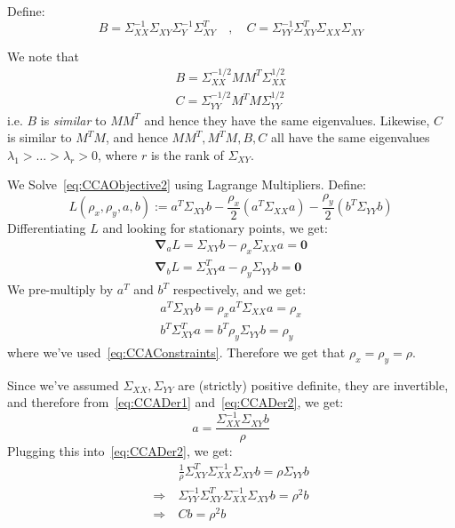 \documentclass{article}
\begin{document}
Define:
\[
  B = \Sigma_{XX} ^{-1} \Sigma_{XY} \Sigma_{Y}^{-1} \Sigma_{XY}^{T} \quad, \quad  C = \Sigma_{YY} ^{-1}  \Sigma_{XY}^{T} \Sigma_{XX} \Sigma_{XY}
\]

We note that
\begin{gather}
  B = \Sigma_{XX}^{-1/2} MM^{T} \Sigma_{XX}^{1/2} \label{eq:CCABasMMT} \\
  C = \Sigma_{YY}^{-1/2} M^{T} M \Sigma_{YY}^{1/2} \label{eq:CCACasMTM}
\end{gather}
i.e. $B$ is \textit{similar} to $MM^{T}$ and hence they have the same eigenvalues. Likewise, $C$ is similar to $M^{T}M$, and hence $MM^{T}, M^{T}M,B,C$ all have the same eigenvalues $\lambda_1 > \ldots > \lambda_{r} > 0$, where $r$ is the rank of $\Sigma_{XY}$.  


We Solve~\cref{eq:CCAObjective2} using Lagrange Multipliers. Define:
\[
  L(\rho_{x}, \rho_{y}, a,b) := a^{T} \Sigma_{XY} b - \frac{\rho_{x}}{2} ( a^{T} \Sigma_{XX} a)  - \frac{\rho_{y}}{2} (b^{T} \Sigma_{YY} b)
\]
Differentiating $L$ and looking for stationary points, we get:
\begin{gather}
  \bm{\nabla}_{a} L = \Sigma_{XY} b - \rho_{x} \Sigma_{XX} a = \bm{0} \label{eq:CCADer1} \\
  \bm{\nabla}_{b} L = \Sigma_{XY}^{T} a - \rho_{y} \Sigma_{YY} b = \bm{0} \label{eq:CCADer2}
\end{gather}
We pre-multiply by $a^{T}$ and $b^{T}$ respectively, and we get:
\begin{gather}
  a^{T}\Sigma_{XY} b = \rho_{x} a^{T} \Sigma_{XX} a = \rho_{x} \label{eq:CCADer3}  \\
  b^{T} \Sigma_{XY}^{T} a = b^{T} \rho_{y} \Sigma_{YY} b  = \rho_{y} \label{eq:CCADer4}
\end{gather}
where we've used~\cref{eq:CCAConstraints}. Therefore we get that $\rho_{x}=\rho_{y}=\rho$. 

Since we've assumed $\Sigma_{XX}, \Sigma_{YY}$ are (strictly) positive definite, they are invertible, and therefore from~\cref{eq:CCADer1} and~\cref{eq:CCADer2}, we get:
\begin{equation}
  a = \frac{\Sigma_{XX} ^{-1} \Sigma_{XY} b}{\rho} 
\end{equation}
Plugging this into~\cref{eq:CCADer2}, we get:
\begin{align*}
  &\frac{1}{\rho} \Sigma_{XY}^{T} \Sigma_{XX} ^{-1}  \Sigma_{XY} b = \rho \Sigma_{YY} b  \\
  \Rightarrow \  & \Sigma_{YY} ^{-1} \Sigma_{XY}^{T} \Sigma_{XX} ^{-1}  \Sigma_{XY} b = \rho ^2 b  \\
  \Rightarrow \ & Cb = \rho ^2 b \label{eq:CCAOptSolC}
\end{align*}
\end{document}
